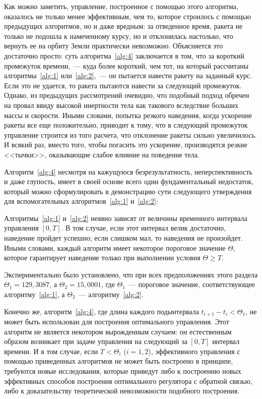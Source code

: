 Как можно заметить, управление, построенное с помощью этого алгоритма, оказалось не только менее эффективным, чем то, которое строилось с помощью предыдущих алгоритмов, но и даже вредным: за отведенное время, ракета не только не подошла к намеченному курсу, но и отклонилась настолько, что вернуть ее на орбиту Земли практически невозможно. Объясняется это достаточно просто: суть алгоритма~\ref{alg:4} заключается в том, что за короткий промежуток времени,~--- куда более короткий, чем тот, на который рассчитаны алгоритмы~\ref{alg:1} или~\ref{alg:2},~--- он пытается навести ракету на заданный курс. Если это не удается, то ракета пытаются навести за следующий промежуток. Однако, из предыдущих рассмотрений очевидно, что подобный подход обречен на провал ввиду высокой инертности тела как такового вследствие больших массы и скорости. Иными словами, попытка резкого наведения, когда ускорение ракеты все еще положительно, приводит к тому, что в следующий промежуток управление строится из того расчета, что отклонение ракеты сильно увеличилось. И всякий раз, вместо того, чтобы погасить это ускорение, производятся резкие <<тычки>>, оказывающие слабое влияние на поведение тела.

Алгоритм~\ref{alg:4} несмотря на кажущуюся безрезультатность, неперспективность и даже глупость, имеет в своей основе всего один фундаментальный недостаток, который можно сформулировать в демонстрацию сути следующего утверждения для вспомогательных алгоритмов~\ref{alg:1} и~\ref{alg:2}:

\begin{statement}
	Алгоритмы~\ref{alg:1} и~\ref{alg:2} неявно зависят от величины временного интервала управления $[0,T]$. В том случае, если этот интервал велик достаточно, наведение пройдет успешно; если слишком мал, то наведения не произойдет. Иными словами, каждый алгоритм имеет некоторое пороговое значение $\Theta$, которое гарантирует наведение только при выполнении условия $\Theta \geqslant T$.
\end{statement}

Экспериментально было установлено, что при всех предположениях этого раздела $\Theta_1=129,3087$, а $\Theta_2=15,0001$, где $\Theta_1$~--- пороговое значение, соответствующее алгоритму~\ref{alg:1}, а $\Theta_2$~--- алгоритму~\ref{alg:2}.

Конечно же, алгоритм~\ref{alg:4}, где длина каждого подынтервала $t_{i+1}-t_i < \Theta_1$, не может быть использован для построения оптимального управления. Этот алгоритм не является некотором вырожденным случаем: он естественным образом возникает при задаче управления на следующий за $[0,T]$ интервал времени. И в том случае, если $T<\Theta_i$ ($i=1,2$), эффективного управления с помощью приведенных алгоритмов не может быть построено в принципе, требуются новые исследования, которые приведут либо к построению новых эффективных способов построения оптимального регулятора с обратной связью, либо к доказательству теоретической невозможности подобного построения.
